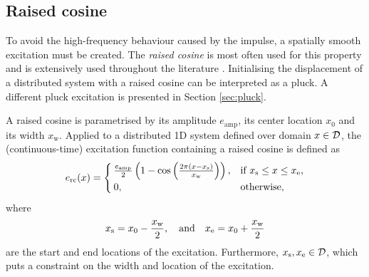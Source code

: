 \subsection{Raised cosine}\label{sec:raisedCosine}
To avoid the high-frequency behaviour caused by the impulse, a spatially smooth excitation must be created. The \textit{raised cosine} is most often used for this property and is extensively used throughout the literature \cite{theBible}. Initialising the displacement of a distributed system with a raised cosine can be interpreted as a pluck. A different pluck excitation is presented in Section \ref{sec:pluck}.

A raised cosine is parametrised by its amplitude $e_\text{amp}$, its center location $x_0$ and its width $x_\text{w}$. Applied to a distributed 1D system defined over domain $x\in \mathcal{D}$, the (continuous-time) excitation function containing a raised cosine is defined as 
\begin{equation}\label{eq:raisedCosCont}
    e_\text{rc}(x) = 
    \begin{cases}
        \frac{e_\text{amp}}{2}\left(1 - \cos\left(\frac{2\pi (x - x_{\text{s}})}{x_\text{w}}\right)\right), & \text{if } x_{\text{s}} \leq x \leq x_{\text{e}},\\
        0, & \text{otherwise},
    \end{cases}
\end{equation}
where 
\begin{equation}\label{eq:xsxe}
    x_{\text{s}} = x_0 - 
    \frac{x_\text{w}}{2}, \quad \text{and} \quad x_{\text{e}} = x_0 + \frac{x_\text{w}}{2}
\end{equation}
are the start and end locations of the excitation. Furthermore, $x_{\text{s}}, x_{\text{e}} \in \mathcal{D}$, which puts a constraint on the width and location of the excitation. 

